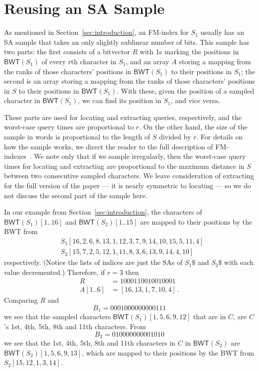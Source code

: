 \documentclass{llncs}
\newcommand{\BWT}
  {\ensuremath{\mathsf{BWT}}}
\begin{document}
\begin{center}
\end{center}





\appendix


\section{Reusing an SA Sample}
\label{sec:sample}

As mentioned in Section~\ref{sec:introduction}, an FM-index for $S_1$ usually has an SA sample that takes an only slightly sublinear number of bits.  This sample has two parts: the first consists of a bitvector $R$ with 1s marking the positions in \(\BWT (S_1)\) of every $r$th character in $S_1$, and an array $A$ storing a mapping from the ranks of those characters' positions in \(\BWT (S_1)\) to their positions in $S_1$; the second is an array storing a mapping from the ranks of those characters' positions in $S$ to their positions in \(\BWT (S_1)\).  With these, given the position of a sampled character in \(\BWT (S_1)\), we can find its position in $S_1$, and vice versa.

These parts are used for locating and extracting queries, respectively, and the worst-case query times are proportional to $r$.  On the other hand, the size of the sample in words is proportional to the length of $S$ divided by $r$.  For details on how the sample works, we direct the reader to the full description of FM-indexes~\cite{FM05}.  We note only that if we sample irregularly, then the worst-case query times for locating and extracting are proportional to the maximum distance in $S$ between two consecutive sampled characters.  We leave consideration of extracting for the full version of the paper --- it is nearly symmetric to locating --- so we do not discuss the second part of the sample here.

In our example from Section~\ref{sec:introduction}, the characters of \(\BWT (S_1) [1..16]\) and \(\BWT (S_2) [1..15]\) are mapped to their positions by the BWT from
\begin{align*}
& S_1 [16, 2, 6, 8, 13, 1, 12, 3, 7, 9, 14, 10, 15, 5, 11, 4]\\
& S_2 [15, 7, 2, 5, 12, 1, 11, 8, 3, 6, 13, 9, 14, 4, 10]
\end{align*}
respectively.  (Notice the lists of indices are just the SAs of $S_1\$$ and $S_2\$$ with each value decremented.)  Therefore, if \(r = 3\) then
\begin{align*}
R & = 1000110010010001\\
A [1..6] & = [16, 13, 1, 7, 10, 4]\,.
\end{align*}
Comparing $R$ and
\[B_1 = 0001000000000111\]
we see that the sampled characters \(\BWT (S_1) [1, 5, 6, 9, 12]\) that are in $C$, are $C$'s 1st, 4th, 5th, 8th and 11th characters.  From
\[B_2 = 010000000001010\]
we see that the 1st, 4th, 5th, 8th and 11th characters in $C$ in \(\BWT (S_2)\) are \(\BWT (S_2) [1, 5, 6, 9, 13]\), which are mapped to their positions by the BWT from \(S_2 [15, 12, 1, 3, 14]\).
\end{document}
